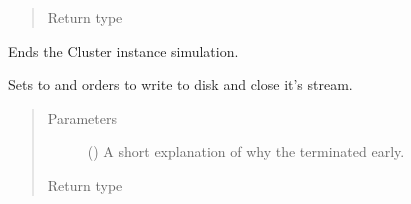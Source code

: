 \documentclass[letterpaper,10pt,english]{sphinxmanual}
\begin{document}
\begin{fulllineitems}
\begin{fulllineitems}
\begin{quote}
\begin{description}
\begin{itemize}
\end{itemize}

\item[{Return type}] \leavevmode
{}

\end{description}\end{quote}

\end{fulllineitems}


\begin{fulllineitems}
\label{\detokenize{app.domain:app.domain.cluster_groups.Cluster._set_fail}}
Ends the Cluster instance simulation.

Sets {\hyperref[\detokenize{app.domain:app.domain.cluster_groups.Cluster.running}]{}} to  and orders
{\hyperref[\detokenize{app.domain.helpers:app.domain.helpers.smart_dataclasses.FileData}]{}} to write
{\hyperref[\detokenize{app.domain.helpers:app.domain.helpers.smart_dataclasses.LoggingData}]{}}
to disk and close it’s
{\hyperref[\detokenize{app.domain.helpers:app.domain.helpers.smart_dataclasses.FileData.out_file}]{}}
stream.
\begin{quote}\begin{description}
\item[{Parameters}] \leavevmode
{} () \textendash{} A short explanation of why the  terminated early.

\item[{Return type}] \leavevmode
{}

\end{description}\end{quote}

\end{fulllineitems}


\end{fulllineitems}
\end{document}
